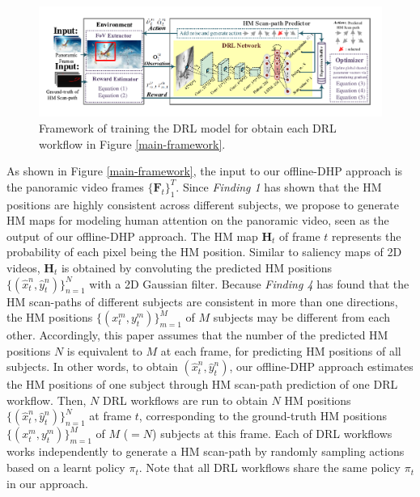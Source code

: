 \documentclass[10pt,journal,compsoc]{IEEEtran}
\begin{document}
\begin{figure}
	\begin{center}
		\centerline{\includegraphics[width=1.5\columnwidth]{figures/dhp_approach/training_framework}}%
		\caption{\footnotesize{Framework of training the DRL model for obtain each DRL workflow in Figure \ref{main-framework}.}}
		\label{train-framework}
	\end{center}
\end{figure}


As shown in Figure \ref{main-framework}, the input to our offline-DHP approach is the panoramic video frames $\{\mathbf{F}_t\}_1^{T}$.
Since \textit{Finding 1} has shown that the HM positions are highly consistent across different subjects,  we propose to generate HM maps for modeling human attention on the panoramic video, seen as the output of our offline-DHP approach. The HM map $\mathbf{H}_t$ of frame $t$ represents the probability of each pixel being the HM position.
Similar to saliency maps of 2D videos, $\mathbf{H}_t$ is obtained by convoluting the predicted HM positions $\{(\hat{x}^n_t, \hat{y}^n_t)\}_{n=1}^{N}$ with a 2D Gaussian filter.
Because \textit{Finding 4} has found that the HM scan-paths of different subjects are consistent in more than one directions, the HM positions $\{({x}^m_t, {y}^m_t)\}_{m=1}^{M}$ of $M$ subjects may be different from each other. Accordingly, this paper assumes that the number of the predicted HM positions $N$ is equivalent to $M$ at each frame, for predicting HM positions of all subjects.
In other words, to obtain $(\hat{x}^n_t, \hat{y}^n_t)$, our offline-DHP approach estimates the HM positions of one subject through HM scan-path prediction of one DRL workflow.
Then, $N$ DRL workflows are run to obtain $N$ HM positions $\{(\hat{x}^n_t, \hat{y}^n_t)\}_{n=1}^{N}$ at frame $t$, corresponding to the ground-truth HM positions  $\{({x}^m_t, {y}^m_t)\}_{m=1}^{M}$ of $M$ ($=N$) subjects at this frame.
Each of DRL workflows works independently to generate a HM scan-path by randomly sampling actions based on a learnt policy $\pi_t$.
Note that all DRL workflows share the same policy $\pi_t$ in our approach.
\end{document}
